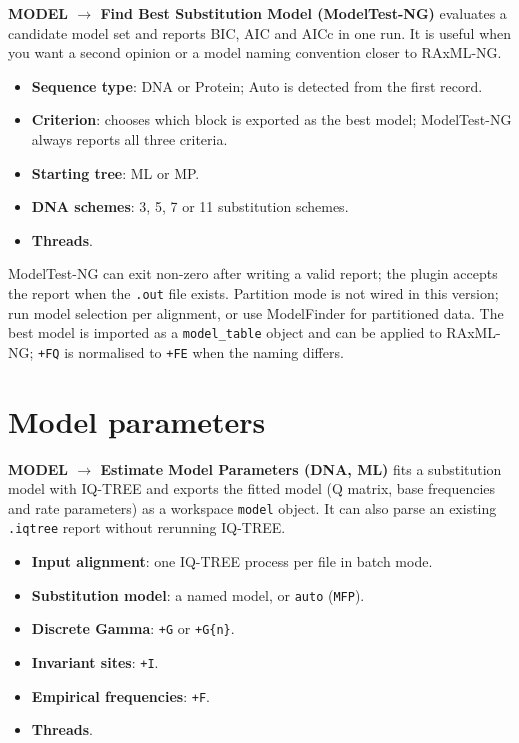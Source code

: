 \documentclass[10pt]{report}
\begin{document}
\textbf{MODEL $\rightarrow$ Find Best Substitution Model (ModelTest-NG)}
evaluates a candidate model set and reports BIC, AIC and AICc in one run. It is
useful when you want a second opinion or a model naming convention closer to
RAxML-NG.

\begin{itemize}
  \item \textbf{Sequence type}: DNA or Protein; Auto is detected from the first
        record.
  \item \textbf{Criterion}: chooses which block is exported as the best model;
        ModelTest-NG always reports all three criteria.
  \item \textbf{Starting tree}: ML or MP.
  \item \textbf{DNA schemes}: 3, 5, 7 or 11 substitution schemes.
  \item \textbf{Threads}.
\end{itemize}

ModelTest-NG can exit non-zero after writing a valid report; the plugin accepts
the report when the \texttt{.out} file exists. Partition mode is not wired in
this version; run model selection per alignment, or use ModelFinder for
partitioned data. The best model is imported as a \texttt{model\_table} object
and can be applied to RAxML-NG; \texttt{+FQ} is normalised to \texttt{+FE} when
the naming differs.

\section{Model parameters}

\textbf{MODEL $\rightarrow$ Estimate Model Parameters (DNA, ML)} fits a
substitution model with IQ-TREE \cite{iqtree3} and exports the fitted model (Q matrix, base
frequencies and rate parameters) as a workspace \texttt{model} object. It can
also parse an existing \texttt{.iqtree} report without rerunning IQ-TREE.

\begin{itemize}
  \item \textbf{Input alignment}: one IQ-TREE process per file in batch mode.
  \item \textbf{Substitution model}: a named model, or \texttt{auto}
        (\texttt{MFP}).
  \item \textbf{Discrete Gamma}: \texttt{+G} or \texttt{+G\{n\}}.
  \item \textbf{Invariant sites}: \texttt{+I}.
  \item \textbf{Empirical frequencies}: \texttt{+F}.
  \item \textbf{Threads}.
\end{itemize}
\end{document}
